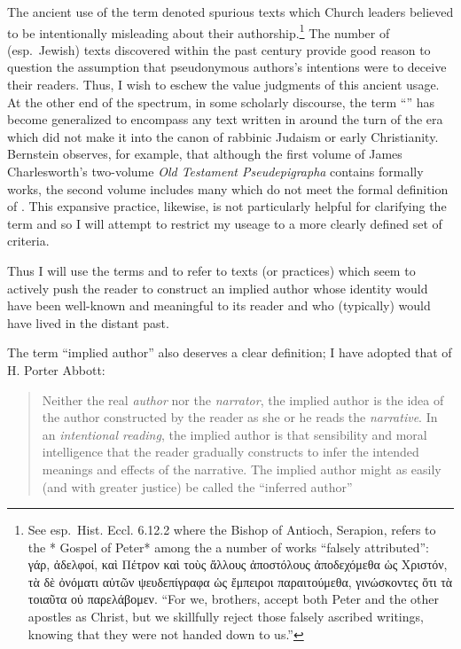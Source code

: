  The ancient use of the term \psa denoted spurious texts which Church leaders believed to be intentionally misleading about their authorship.\footnote{See esp.~Hist. Eccl. 6.12.2 where the Bishop of   Antioch, Serapion, refers to the * Gospel of Peter* among the a number   of works ``falsely attributed'': γάρ, ἀδελφοί, καὶ Πέτρον καὶ τοὺς   ἄλλους ἀποστόλους ἀποδεχόμεθα ὡς Χριστόν, τὰ δὲ ὀνόματι αὐτῶν   ψευδεπίγραφα ὡς ἔμπειροι παραιτούμεθα, γινώσκοντες ὅτι τὰ τοιαῦτα οὐ   παρελάβομεν. ``For we, brothers, accept both Peter and the other   apostles as Christ, but we skillfully reject those falsely ascribed   writings, knowing that they were not handed down to us.''} The number of (esp.~Jewish) \psgraphical texts discovered within the past century provide good reason to question the assumption that pseudonymous authors's intentions were to deceive their readers.\autocites[53--58]{mroczek2016}[See also][]{reed_jts2009} Thus, I wish to eschew the value judgments of this ancient usage. At the other end of the spectrum, in some scholarly discourse, the term ``\psa'' has become generalized to encompass any text written in around the turn of the era which did not make it into the canon of rabbinic Judaism or early Christianity. Bernstein observes, for example, that although the first volume of James Charlesworth's two-volume \emph{Old Testament Pseudepigrapha} contains formally \psgraphic works, the second volume includes many which do not meet the formal definition of \psa.\autocites[2]{bernstein_chazon-etal1999}{charlesworth_OTP} This expansive practice, likewise, is not particularly helpful for clarifying the term and so I will attempt to restrict my useage to a more clearly defined set of criteria.

 Thus I will use the terms \psy and \psa to refer to texts (or practices) which seem to actively push the reader to construct an implied author whose identity would have been well-known and meaningful to its reader and who (typically) would have lived in the distant past.

 The term ``implied author'' also deserves a clear definition; I have adopted that of H. Porter Abbott:

 \begin{quote} Neither the real \emph{author} nor the \emph{narrator}, the implied author is the idea of the author constructed by the reader as she or he reads the \emph{narrative}. In an \emph{intentional reading}, the implied author is that sensibility and moral intelligence that the reader gradually constructs to infer the intended meanings and effects of the narrative. The implied author might as easily (and with greater justice) be called the ``inferred author'' \autocite[235]{abbott2008} \end{quote}


